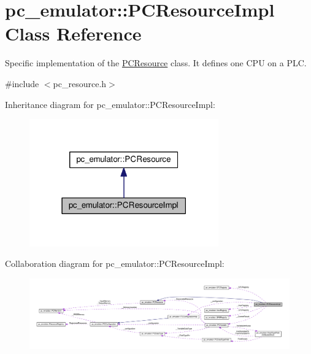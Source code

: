 \hypertarget{classpc__emulator_1_1PCResourceImpl}{}\section{pc\+\_\+emulator\+:\+:P\+C\+Resource\+Impl Class Reference}
\label{classpc__emulator_1_1PCResourceImpl}


Specific implementation of the \hyperlink{classpc__emulator_1_1PCResource}{P\+C\+Resource} class. It defines one C\+PU on a P\+LC.  




{\ttfamily \#include $<$pc\+\_\+resource.\+h$>$}



Inheritance diagram for pc\+\_\+emulator\+:\+:P\+C\+Resource\+Impl\+:\nopagebreak
\begin{figure}[H]
\begin{center}
\leavevmode
\includegraphics[width=231pt]{classpc__emulator_1_1PCResourceImpl__inherit__graph}
\end{center}
\end{figure}


Collaboration diagram for pc\+\_\+emulator\+:\+:P\+C\+Resource\+Impl\+:\nopagebreak
\begin{figure}[H]
\begin{center}
\leavevmode
\includegraphics[width=350pt]{classpc__emulator_1_1PCResourceImpl__coll__graph}
\end{center}
\end{figure}
